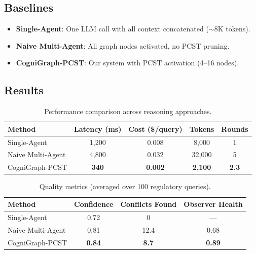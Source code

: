 \documentclass[11pt,a4paper]{article}
\begin{document}
\subsection{Baselines}
\begin{itemize}
    \item \textbf{Single-Agent}: One LLM call with all context concatenated ($\sim$8K tokens).
    \item \textbf{Naive Multi-Agent}: All graph nodes activated, no PCST pruning.
    \item \textbf{CogniGraph-PCST}: Our system with PCST activation (4--16 nodes).
\end{itemize}

\subsection{Results}

\begin{table}[h]
\centering
\caption{Performance comparison across reasoning approaches.}
\label{tab:results}
\begin{tabular}{lcccc}
\toprule
\textbf{Method} & \textbf{Latency (ms)} & \textbf{Cost (\$/query)} & \textbf{Tokens} & \textbf{Rounds} \\
\midrule
Single-Agent & 1,200 & 0.008 & 8,000 & 1 \\
Naive Multi-Agent & 4,800 & 0.032 & 32,000 & 5 \\
CogniGraph-PCST & \textbf{340} & \textbf{0.002} & \textbf{2,100} & \textbf{2.3} \\
\bottomrule
\end{tabular}
\end{table}

\begin{table}[h]
\centering
\caption{Quality metrics (averaged over 100 regulatory queries).}
\label{tab:quality}
\begin{tabular}{lccc}
\toprule
\textbf{Method} & \textbf{Confidence} & \textbf{Conflicts Found} & \textbf{Observer Health} \\
\midrule
Single-Agent & 0.72 & 0 & --- \\
Naive Multi-Agent & 0.81 & 12.4 & 0.68 \\
CogniGraph-PCST & \textbf{0.84} & \textbf{8.7} & \textbf{0.89} \\
\bottomrule
\end{tabular}
\end{table}
\end{document}
